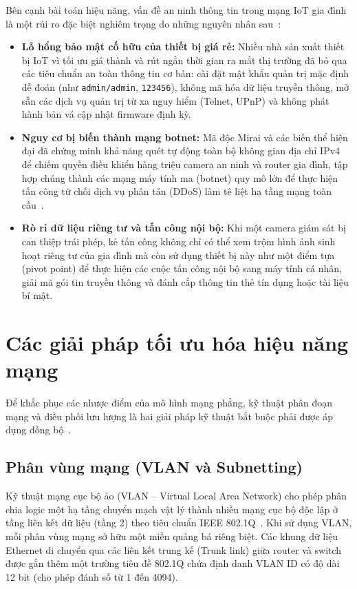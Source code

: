 Bên cạnh bài toán hiệu năng, vấn đề an ninh thông tin trong mạng IoT gia đình là một rủi ro đặc biệt nghiêm trọng do những nguyên nhân sau~\cite{antonakakis2017understanding}:
\begin{itemize}
    \item \textbf{Lỗ hổng bảo mật cố hữu của thiết bị giá rẻ:} Nhiều nhà sản xuất thiết bị IoT vì tối ưu giá thành và rút ngắn thời gian ra mắt thị trường đã bỏ qua các tiêu chuẩn an toàn thông tin cơ bản: cài đặt mật khẩu quản trị mặc định dễ đoán (như \texttt{admin/admin}, \texttt{123456}), không mã hóa dữ liệu truyền thông, mở sẵn các dịch vụ quản trị từ xa nguy hiểm (Telnet, UPnP) và không phát hành bản vá cập nhật firmware định kỳ.
    \item \textbf{Nguy cơ bị biến thành mạng botnet:} Mã độc Mirai và các biến thể hiện đại đã chứng minh khả năng quét tự động toàn bộ không gian địa chỉ IPv4 để chiếm quyền điều khiển hàng triệu camera an ninh và router gia đình, tập hợp chúng thành các mạng máy tính ma (botnet) quy mô lớn để thực hiện tấn công từ chối dịch vụ phân tán (DDoS) làm tê liệt hạ tầng mạng toàn cầu~\cite{antonakakis2017understanding}.
    \item \textbf{Rò rỉ dữ liệu riêng tư và tấn công nội bộ:} Khi một camera giám sát bị can thiệp trái phép, kẻ tấn công không chỉ có thể xem trộm hình ảnh sinh hoạt riêng tư của gia đình mà còn sử dụng thiết bị này như một điểm tựa (pivot point) để thực hiện các cuộc tấn công nội bộ sang máy tính cá nhân, giải mã gói tin truyền thông và đánh cắp thông tin thẻ tín dụng hoặc tài liệu bí mật.
\end{itemize}

\section{Các giải pháp tối ưu hóa hiệu năng mạng}
\label{sec:giai-phap-toi-uu-hieu-nang}

Để khắc phục các nhược điểm của mô hình mạng phẳng, kỹ thuật phân đoạn mạng và điều phối lưu lượng là hai giải pháp kỹ thuật bắt buộc phải được áp dụng đồng bộ~\cite{kurose2021computer, nguyenthuchai2010}.

\subsection{Phân vùng mạng (VLAN và Subnetting)}
\label{subsec:phan-vung-mang-vlan}

Kỹ thuật mạng cục bộ ảo (VLAN -- Virtual Local Area Network) cho phép phân chia logic một hạ tầng chuyển mạch vật lý thành nhiều mạng cục bộ độc lập ở tầng liên kết dữ liệu (tầng 2) theo tiêu chuẩn IEEE 802.1Q~\cite{ieee8021q2018}. Khi sử dụng VLAN, mỗi phân vùng mạng sở hữu một miền quảng bá riêng biệt. Các khung dữ liệu Ethernet di chuyển qua các liên kết trung kế (Trunk link) giữa router và switch được gắn thêm một trường tiêu đề 802.1Q chứa định danh VLAN ID có độ dài 12 bit (cho phép đánh số từ 1 đến 4094).


